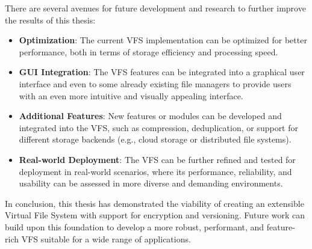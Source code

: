 There are several avenues for future development and research to further improve the results of this thesis:

\begin{itemize}
    \item \textbf{Optimization}: The current VFS implementation can be optimized for better performance, both in terms of storage efficiency and processing speed.
    \item \textbf{GUI Integration}: The VFS features can be integrated into a graphical user interface and even to some already existing file managers to provide users with an even more intuitive and visually appealing interface.
    \item \textbf{Additional Features}: New features or modules can be developed and integrated into the VFS, such as compression, deduplication, or support for different storage backends (e.g., cloud storage or distributed file systems).
    \item \textbf{Real-world Deployment}: The VFS can be further refined and tested for deployment in real-world scenarios, where its performance, reliability, and usability can be assessed in more diverse and demanding environments.
\end{itemize}

In conclusion, this thesis has demonstrated the viability of creating an extensible Virtual File System with support for encryption and versioning.
Future work can build upon this foundation to develop a more robust, performant, and feature-rich VFS suitable for a wide range of applications.